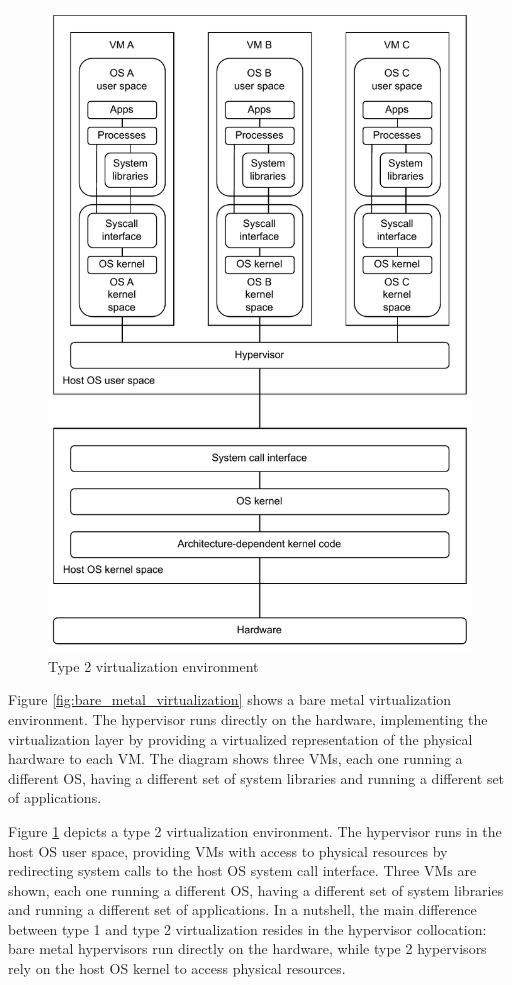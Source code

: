 \begin{figure}[htbp]
    \centering
    \includegraphics{assets/type_2_virtualization.pdf}
    \caption{Type 2 virtualization environment}
    \label{fig:tipe_2_virtualization}
\end{figure}

Figure \ref{fig:bare_metal_virtualization} shows a bare metal virtualization environment. 
The hypervisor runs directly on the hardware, implementing the virtualization layer by providing a virtualized representation of the physical hardware to each VM.
The diagram shows three VMs, each one running a different OS, having a different set of system libraries and running a different set of applications. 

Figure \ref{fig:tipe_2_virtualization} depicts a type 2 virtualization environment.
The hypervisor runs in the host OS user space, providing VMs with access to physical resources by redirecting system calls to the host OS system call interface. Three VMs are shown, each one running a different OS, having a different set of system libraries and running a different set of applications.
In a nutshell, the main difference between type 1 and type 2 virtualization resides in the hypervisor collocation: bare metal hypervisors run directly on the hardware, while type 2 hypervisors rely on the host OS kernel to access physical resources. 

